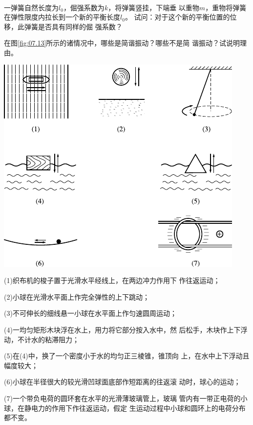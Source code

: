 ~\vspace{2em}
\begin{questions}

  \question 一弹簧自然长度为$ l _ { 0 } $，倔强系数为$ k $，将弹簧竖挂，下端垂
  以重物$ m $，重物将弹簧在弹性限度内拉长到一个新的平衡长度$ l _ { 0 } $。
  试问：对于这个新的平衡位置的位移，此弹簧是否具有同样的倔
  强系数？

  \question 在图\ref{fig:07.13}\;所示的诸情况中，哪些是简谐振动？哪些不是简
  谐振动？试说明理由。
  \begin{figurex}
    \centering
    \includegraphics{figure/fig07.13}
    \caption{}
    \label{fig:07.13}
  \end{figurex}

  (1)织布机的梭子置于光滑水平经线上，在两边冲力作用下
  作往返运动；

  (2)小球在光滑水平面上作完全弹性的上下跳动；

  (3)不可伸长的细线悬一小球在水平面上作匀速圆周运动；

  (4)一均匀矩形木块浮在水上，用力将它部分按入水中，然
  后松手，木块作上下浮动，不计水的粘滞阻力；

  (5)在(4)中，换了一个密度小于水的均匀正三棱锥，锥顶向
  上，在水中上下浮动且幅度较大；

  (6)小球在半径很大的较光滑凹球面底部作短距离的往返滚
  动时，球心的运动；

  (7)一个带负电荷的圆环套在水平的光滑薄玻璃管上，玻璃
  管内有一带正电荷的小球，在静电力的作用下作往返运动，假定
  生运动过程中小球和圆环上的电荷分布都不变。


\end{questions}
